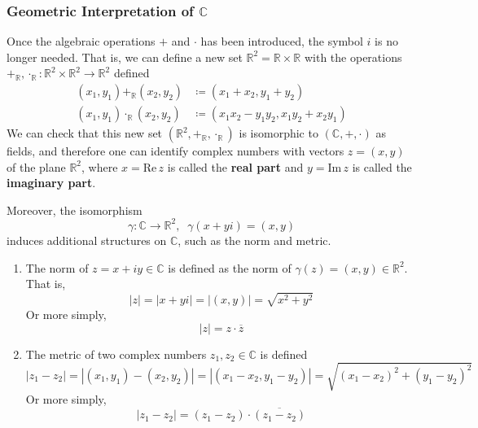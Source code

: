   \subsubsection[Geometric Interpretation of C]{Geometric Interpretation of $\mathbb{C}$}
  Once the algebraic operations $+$ and $\cdot$ has been introduced, the symbol $i$ is no longer needed. That is, we can define a new set $\mathbb{R}^2 = \mathbb{R} \times \mathbb{R}$ with the operations $+_\mathbb{R}, \cdot_\mathbb{R} : \mathbb{R}^2 \times \mathbb{R}^2 \to \mathbb{R}^2$ defined
  \begin{align*}
      (x_1, y_1) +_\mathbb{R} (x_2, y_2) & \coloneqq (x_1 + x_2, y_1 + y_2) \\
      (x_1, y_1) \cdot_\mathbb{R} (x_2, y_2) & \coloneqq (x_1 x_2 - y_1 y_2, x_1 y_2 + x_2 y_1)
  \end{align*}
  We can check that this new set $(\mathbb{R}^2, +_\mathbb{R}, \cdot_{\mathbb{R}})$ is isomorphic to $(\mathbb{C}, +, \cdot)$ as fields, and therefore one can identify complex numbers with vectors $z = (x, y)$ of the plane $\mathbb{R}^2$, where $x = \text{Re}\,z$ is called the \textbf{real part} and $y = \text{Im}\,z$ is called the \textbf{imaginary part}. 

  \begin{definition}
    \label{def:norm-metric-of-c}
    Moreover, the isomorphism
    \begin{equation}
      \gamma: \mathbb{C} \to \mathbb{R}^2, \;\; \gamma(x + yi) = (x, y)
    \end{equation}
    induces additional structures on $\mathbb{C}$, such as the norm and metric. 
    \begin{enumerate}
      \item The norm of $z = x + iy \in \mathbb{C}$ is defined as the norm of $\gamma(z) = (x, y) \in \mathbb{R}^2$. That is, 
      \begin{equation}
        |z| = |x + yi| = |(x, y)| = \sqrt{x^2 + y^2}
      \end{equation}
      Or more simply, 
      \begin{equation}
        |z| = z \cdot \overline{z}
      \end{equation}
      \item The metric of two complex numbers $z_1, z_2 \in \mathbb{C}$ is defined
      \begin{equation}
        |z_1 - z_2| = |(x_1, y_1) - (x_2, y_2)| = |(x_1 - x_2, y_1 - y_2)| = \sqrt{(x_1 - x_2)^2 + (y_1 - y_2)^2}
      \end{equation}
      Or more simply, 
      \begin{equation}
        |z_1 - z_2| = (z_1 - z_2) \cdot \overline{(z_1 - z_2)}
      \end{equation}
    \end{enumerate}
  \end{definition}

